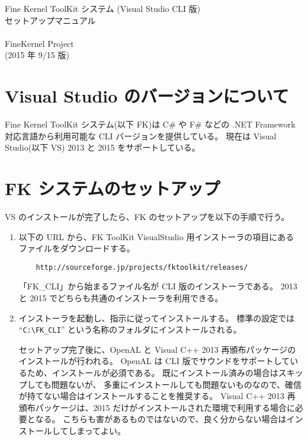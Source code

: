 \documentclass[a4j]{jarticle}
\begin{document}
\begin{center}
{\Large Fine Kernel ToolKit システム (Visual Studio CLI 版) \\
	セットアップマニュアル} \\ ~ \\
{\Large FineKernel Project} \\
(2015 年 9/15 版)
\end{center}


\section{Visual Studio のバージョンについて}
Fine Kernel ToolKit システム(以下 FK)は 
C# や F# などの .NET Framework 対応言語から利用可能な CLI バージョンを提供している。
現在は Visual Studio(以下 VS) 2013 と 2015 をサポートしている。

\section{FK システムのセットアップ}
VS のインストールが完了したら、FK のセットアップを以下の手順で行う。

\begin{enumerate}
\item 以下の URL から、FK ToolKit VisualStudio 用インストーラの項目にある
ファイルをダウンロードする。

\begin{verbatim}
    http://sourceforge.jp/projects/fktoolkit/releases/
\end{verbatim}

「FK\_CLI」から始まるファイル名が CLI 版のインストーラである。
2013 と 2015 でどちらも共通のインストーラを利用できる。

\item インストーラを起動し、指示に従ってインストールする。
標準の設定では ``\verb+C:\FK_CLI+'' という名称のフォルダにインストールされる。

セットアップ完了後に、OpenAL と Visual C++ 2013 再頒布パッケージのインストールが行われる。
OpenAL は CLI 版でサウンドをサポートしているため、インストールが必須である。
既にインストール済みの場合はスキップしても問題ないが、
多重にインストールしても問題ないものなので、確信が持てない場合はインストールすることを推奨する。
Visual C++ 2013 再頒布パッケージは、2015 だけがインストールされた環境で利用する場合に必要となる。
こちらも害があるものではないので、良く分からない場合はインストールしてしまってよい。

\end{enumerate}
\end{document}
